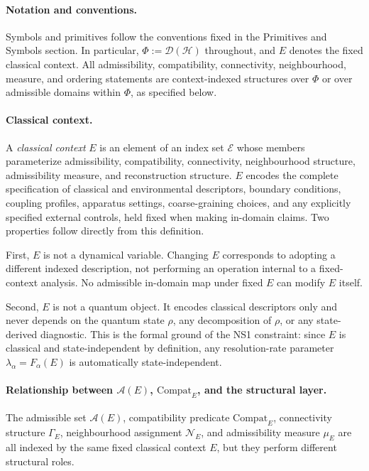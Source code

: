 \documentclass[aps,prx,onecolumn,11pt]{revtex4-2}
\theoremstyle{plain}
\theoremstyle{definition}
\theoremstyle{remark}
\begin{document}
\paragraph{Notation and conventions.}
Symbols and primitives follow the conventions fixed in the Primitives and
Symbols section. In particular, $\Phi := \mathcal{D}(\mathcal{H})$
throughout, and $E$ denotes the fixed classical context. All
admissibility, compatibility, connectivity, neighbourhood, measure, and
ordering statements are context-indexed structures over $\Phi$ or over
admissible domains within $\Phi$, as specified below.

\paragraph{Classical context.}
A \emph{classical context} $E$ is an element of an index set
$\mathcal{E}$ whose members parameterize admissibility, compatibility,
connectivity, neighbourhood structure, admissibility measure, and
reconstruction structure. $E$ encodes the complete specification of
classical and environmental descriptors, boundary conditions, coupling
profiles, apparatus settings, coarse-graining choices, and any
explicitly specified external controls, held fixed when making
in-domain claims. Two properties follow directly from this definition.

First, $E$ is not a dynamical variable. Changing $E$ corresponds to
adopting a different indexed description, not performing an operation
internal to a fixed-context analysis. No admissible in-domain map under
fixed $E$ can modify $E$ itself.

Second, $E$ is not a quantum object. It encodes classical descriptors
only and never depends on the quantum state $\rho$, any decomposition
of $\rho$, or any state-derived diagnostic. This is the formal ground
of the NS1 constraint: since $E$ is classical and state-independent by
definition, any resolution-rate parameter
$\lambda_\alpha = F_\alpha(E)$ is automatically state-independent.

\paragraph{Relationship between $\mathcal{A}(E)$,
$\mathrm{Compat}_E$, and the structural layer.}
The admissible set $\mathcal{A}(E)$, compatibility predicate
$\mathrm{Compat}_E$, connectivity structure $\Gamma_E$, neighbourhood
assignment $\mathcal{N}_E$, and admissibility measure $\mu_E$ are all
indexed by the same fixed classical context $E$, but they perform
different structural roles.
\end{document}
